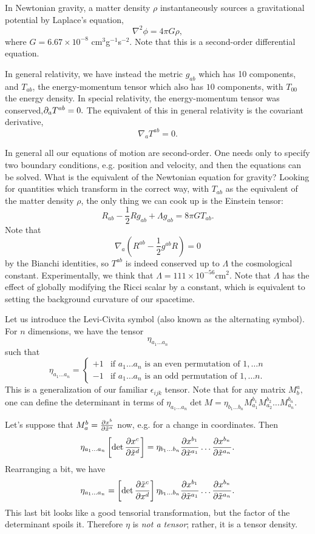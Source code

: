 In Newtonian gravity, a matter density $\rho$ instantaneously sources a gravitational potential by Laplace's equation,
$$\nabla^2 \phi=4\pi G\rho,$$
where $G=6.67\times 10^{-8}$ cm$^3$g$^{-1}$s$^{-2}$. Note that this is a second-order differential equation.

In general relativity, we have instead the metric $g_{ab}$ which has 10 components, and $T_{ab}$, the energy-momentum tensor which also has $10$ components, with $T_{00}$ the energy density. In special relativity, the energy-momentum tensor was conserved,$\partial_a T^{ab}=0.$ The equivalent of this in general relativity is the covariant derivative,
$$\nabla_a T^{ab}=0.$$

In general all our equations of motion are second-order. One needs only to specify two boundary conditions, e.g. position and velocity, and then the equations can be solved. What is the equivalent of the Newtonian equation for gravity? Looking for quantities which transform in the correct way, with $T_{ab}$ as the equivalent of the matter density $\rho$, the only thing we can cook up is the Einstein tensor:
$$R_{ab}-\frac{1}{2}R g_{ab}+\Lambda g_{ab}=8\pi G T_{ab}.$$
Note that
$$\nabla_a(R^{ab}-\frac{1}{2} g^{ab}R)=0$$
by the Bianchi identities, so $T^{ab}$ is indeed conserved up to $\Lambda$ the cosmological constant. Experimentally, we think that $\Lambda=111\times 10^{-56}$cm$^2$. Note that $\Lambda$ has the effect of globally modifying the Ricci scalar by a constant, which is equivalent to setting the background curvature of our spacetime.

\begin{defn}
Let us introduce the Levi-Civita symbol (also known as the alternating symbol). For $n$ dimensions, we have the tensor
$$\eta_{a_1\ldots a_n}$$ such that
$$\eta_{a_1\ldots a_n}=\begin{cases}
+1 &\text{if }a_1\ldots a_n\text{ is an even permutation of }1,\ldots n\\
-1 &\text{if }a_1\ldots a_n\text{ is an odd permutation of }1,\ldots n.
\end{cases}$$
This is a generalization of our familiar $\epsilon_{ijk}$ tensor. Note that for any matrix $M^a_b,$ one can define the determinant in terms of
$\eta_{a_1\ldots a_n}\det M = \eta_{b_1\ldots b_n}M^{b_1}_{a_1} M^{b_2}_{a_2}\ldots M^{b_n}_{a_n}.$
\end{defn}

Let's suppose that $M^b_a=\frac{\partial x^b}{\partial \tilde x^a}$ now, e.g. for a change in coordinates. Then
$$\eta_{a_1\ldots a_n}\left[\det \frac{\partial x^c}{\partial \tilde x^d}\right]=\eta_{b_1\ldots b_n}\frac{\partial x^{b_1}}{\partial \tilde x^{a_1}}\ldots \frac{\partial x^{b_n}}{\partial \tilde x^{a_n}}.$$
Rearranging a bit, we have
$$\eta_{a_1\ldots a_n}=\left[\det \frac{\partial \tilde x^c}{\partial x^d}\right]\eta_{b_1\ldots b_n}\frac{\partial x^{b_1}}{\partial \tilde x^{a_1}}\ldots \frac{\partial x^{b_n}}{\partial \tilde x^{a_n}}.$$
This last bit looks like a good tensorial transformation, but the factor of the determinant spoils it. Therefore $\eta$ is \emph{not a tensor}; rather, it is a tensor density.


